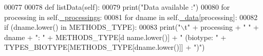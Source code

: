 \begin{DoxyCode}
00077 
00078     \textcolor{keyword}{def }listData(self):
00079         \textcolor{keywordflow}{print}(\textcolor{stringliteral}{"Data available :"})
00080         \textcolor{keywordflow}{for} processing \textcolor{keywordflow}{in} self.\hyperlink{classnavicom_1_1navicom_1_1NaviCom_ac6a14d6a91cd2f236eef71496a6f249c}{_processings}:
00081             \textcolor{keywordflow}{for} dname \textcolor{keywordflow}{in} self.\hyperlink{classnavicom_1_1navicom_1_1NaviCom_a407b2b5c30a5652ee85c4be54b3e6679}{_data}[processing]:
00082                 \textcolor{keywordflow}{if} (dname.lower() \textcolor{keywordflow}{in} METHODS\_TYPE):
00083                     \textcolor{keywordflow}{print}(\textcolor{stringliteral}{"\(\backslash\)t"} + processing + \textcolor{stringliteral}{" "} + dname + \textcolor{stringliteral}{": "} + METHODS\_TYPE[d
      name.lower()] + \textcolor{stringliteral}{" (biotype: "} + TYPES\_BIOTYPE[METHODS\_TYPE[dname.lower()]] + \textcolor{stringliteral}{")"})
      

\end{DoxyCode}
